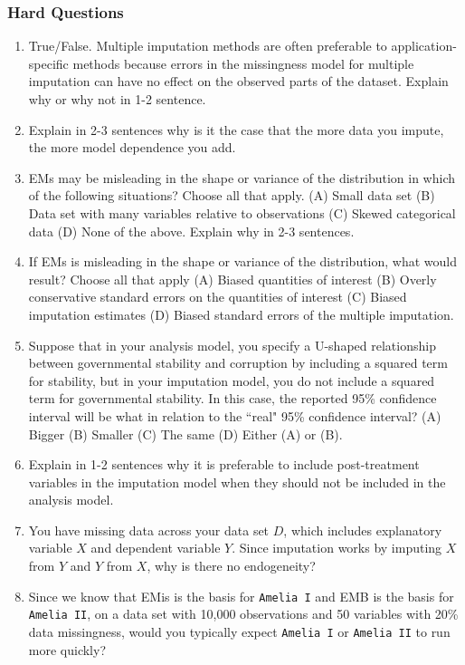 \documentclass[11pt]{article}
\begin{document}
\subsubsection{Hard Questions}
\begin{enumerate}
\item True/False. Multiple imputation methods are often preferable to application-specific methods because errors in the missingness model for multiple imputation can have no effect on the observed parts of the dataset. Explain why or why not in 1-2 sentence. %
\item Explain in 2-3 sentences why is it the case that the more data you impute, the more model dependence you add.
\item EMs may be misleading in the shape or variance of the distribution in which of the following situations? Choose all that apply. (A) Small data set (B) Data set with many variables relative to observations (C) Skewed categorical data (D) None of the above. Explain why in 2-3 sentences. %
\item If EMs is misleading in the shape or variance of the distribution, what would result? Choose all that apply (A) Biased quantities of interest (B) Overly conservative standard errors on the quantities of interest (C) Biased imputation estimates (D) Biased standard errors of the multiple imputation. %
\item Suppose that in your analysis model, you specify a U-shaped relationship between governmental stability and corruption by including a squared term for stability, but in your imputation model, you do not include a squared term for governmental stability. In this case, the reported 95\% confidence interval will be what in relation to the ``real" 95\% confidence interval? (A) Bigger (B) Smaller (C) The same (D) Either (A) or (B). %
\item Explain in 1-2 sentences why it is preferable to include post-treatment variables in the imputation model when they should not be included in the analysis model.
\item You have missing data across your data set $D$, which includes explanatory variable $X$ and dependent variable $Y$. Since imputation works by imputing $X$ from $Y$ and $Y$ from $X$, why is there no endogeneity?
\item Since we know that EMis is the basis for {\tt Amelia I} and EMB is the basis for {\tt Amelia II}, on a data set with 10,000 observations and 50 variables with 20\% data missingness, would you typically expect {\tt Amelia I} or {\tt Amelia II} to run more quickly? %

\end{enumerate}
\end{document}
